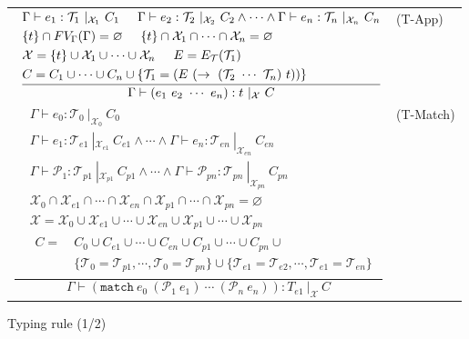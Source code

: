 \documentclass{article}
\begin{document}
\begin{figure}[tb]
\begin{tabular}{rlrl}
        \multicolumn{3}{r}{
        $\dfrac{
            \begin{aligned}
                &\Gamma \vdash e_1 : \mathcal{T}_1\ |_{\mathcal{X}_1}\ C_1 \hspace{5mm}
                    \Gamma \vdash e_2 : \mathcal{T}_2\ |_{\mathcal{X}_2}\ C_2 \land \cdots \land \Gamma \vdash e_n : \mathcal{T}_n\ |_{\mathcal{X}_n}\ C_n \\
                &\{t\} \cap FV_\Gamma(\Gamma) = \varnothing \hspace{5mm} \{t\} \cap \mathcal{X}_1 \cap \cdots \cap \mathcal{X}_n = \varnothing\\
                &\mathcal{X} = \{t\} \cup \mathcal{X}_1 \cup \cdots \cup \mathcal{X}_n \hspace{5mm} E = E_\mathcal{T}(\mathcal{T}_1) \\
                &C = C_1 \cup \cdots \cup C_n \cup \{ \mathcal{T}_1 = (E\ (\rightarrow\ (\mathcal{T}_2\ \cdots\ \mathcal{T}_n)\ t)) \}
            \end{aligned}
        }{
            \Gamma \vdash (e_1\ e_2\ \cdots\ e_n) : t\ |_\mathcal{X}\ C
        }$} & (T-App) \vspace{5mm} \\

        \multicolumn{3}{r}{
        $\dfrac{
            \begin{aligned}
                &\Gamma \vdash e_0 : \mathcal{T}_0\ |_{\mathcal{X}_0}\ C_0 \\
                &\Gamma \vdash e_1 : \mathcal{T}_{e1}\ |_{\mathcal{X}_{e1}}\ C_{e1} \land \cdots \land \Gamma \vdash e_n : \mathcal{T}_{en}\ |_{\mathcal{X}_{en}}\ C_{en} \\
                &\Gamma \vdash \mathcal{P}_1 : \mathcal{T}_{p1}\ |_{\mathcal{X}_{p1}}\ C_{p1} \land \cdots \land \Gamma \vdash \mathcal{P}_{pn} : \mathcal{T}_{pn}\ |_{\mathcal{X}_{pn}}\ C_{pn} \\
                &\mathcal{X}_0 \cap \mathcal{X}_{e1} \cap \cdots \cap \mathcal{X}_{en} \cap \mathcal{X}_{p1} \cap \cdots \cap \mathcal{X}_{pn} = \varnothing \\
                &\mathcal{X} = \mathcal{X}_0 \cup \mathcal{X}_{e1} \cup \cdots \cup \mathcal{X}_{en} \cup \mathcal{X}_{p1} \cup \cdots \cup \mathcal{X}_{pn} \\
                &\begin{aligned}
                    C =\ &C_0 \cup C_{e1} \cup \cdots \cup C_{en} \cup C_{p1} \cup \cdots \cup C_{pn} \cup \\
                         &\{\mathcal{T}_0 = \mathcal{T}_{p1}, \cdots, \mathcal{T}_0 = \mathcal{T}_{pn}\} \cup
                         \{\mathcal{T}_{e1} = \mathcal{T}_{e2}, \cdots, \mathcal{T}_{e1} = \mathcal{T}_{en}\}
                \end{aligned}
            \end{aligned}
        }{
            \Gamma \vdash (\mathtt{match}\ e_0\ (\mathcal{P}_1\ e_1)\ \cdots\ (\mathcal{P}_n\ e_n)) : T_{e1}\ |_\mathcal{X}\ C
        }$} & (T-Match)
    \end{tabular}
    \caption{Typing rule (1/2)}
\end{figure}
\end{document}
